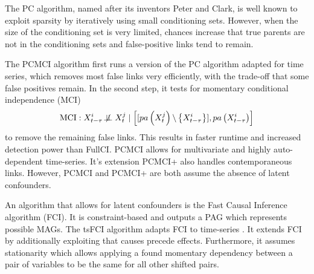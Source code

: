 \documentclass[conference]{IEEEtran}
\begin{document}
The PC algorithm, named after its inventors Peter and Clark, is well known to exploit sparsity by iteratively using small conditioning sets\cite{runge_pcmci_2019}. However, when the size of the conditioning set is very limited, chances increase that true parents are not in the conditioning sets and false-positive links tend to remain\cite{runge_pcmci_2019}.

The PCMCI algorithm first runs a version of the PC algorithm adapted for time series, which removes most false links very efficiently, with the trade-off that some false positives remain\cite{runge_pcmci_2019}. In the second step, it tests for momentary conditional independence (MCI)
\begin{equation}
\mathrm{MCI}: X_{t-\tau}^{i} \not\!\perp\!\!\!\perp X_{t}^{j} \mid \left[[{pa}\left(X_{t}^{j}\right) \backslash\left\{X_{t-\tau}^{i}\right\}], {pa}\left(X_{t-\tau}^{i}\right)\right]
\end{equation}
to remove the remaining false links\cite{runge_pcmci_2019}.
This results in faster runtime and increased detection power than FullCI\cite{runge_pcmci_2019}.
PCMCI allows for multivariate and highly auto-dependent time-series. It's extension PCMCI+ also handles contemporaneous links. However, PCMCI and PCMCI+ are both assume the absence of latent confounders.

An algorithm that allows for latent confounders is the Fast Causal Inference algorithm (FCI)\cite{spirtes_causation_2000}. It is constraint-based and outputs a PAG which represents possible MAGs.
The tsFCI algorithm adapts FCI to time-series \cite{entner_causal_2010}. It extends FCI by additionally exploiting that causes precede effects. Furthermore, it assumes stationarity which allows applying a found momentary dependency between a pair of variables to be the same for all other shifted pairs.
\end{document}
